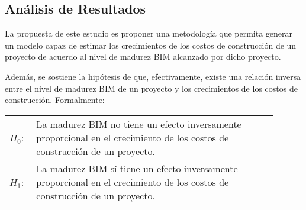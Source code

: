 


\subsection{Análisis de Resultados}

La propuesta de este estudio es proponer una metodología que permita generar un modelo capaz de estimar los crecimientos de los costos de construcción de un proyecto de acuerdo al nivel de madurez BIM alcanzado por dicho proyecto. 

Además, se sostiene la hipótesis de que, efectivamente, existe una relación inversa entre el nivel de madurez BIM de un proyecto y los crecimientos de los costos de construcción. Formalmente:

\begin{table}[H]
    \begin{tabular}{l p{0.9\linewidth}}
        $H_0$: & La madurez BIM no tiene un efecto inversamente proporcional en el crecimiento de los costos de construcción de un proyecto. \\

        $H_1$: & La madurez BIM sí tiene un efecto inversamente proporcional en el crecimiento de los costos de construcción de un proyecto.
    \end{tabular}
\end{table}

